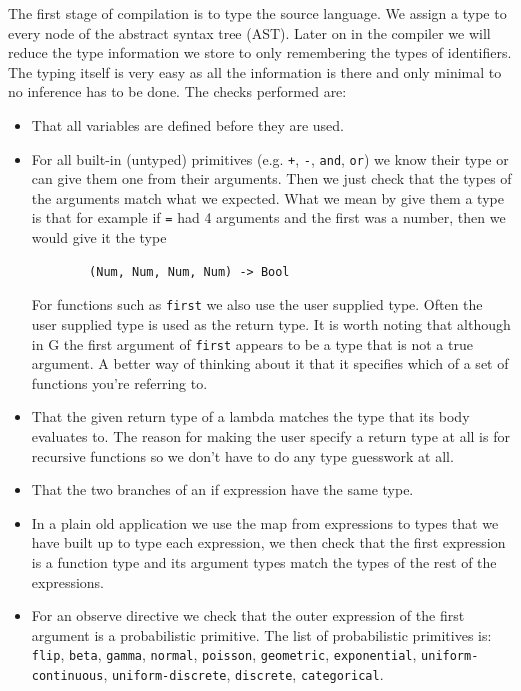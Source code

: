 \documentclass[a4paper]{article}
\begin{document}
The first stage of compilation is to type the source language. We assign a type to every node of the abstract syntax tree (AST). Later on in the compiler we will reduce the type information we store to only remembering the types of identifiers. The typing itself is very easy as all the information is there and only minimal to no inference has to be done. The checks performed are:
\begin{itemize}
\item
	That all variables are defined before they are used.

\item
	For all built-in (untyped) primitives (e.g. \texttt{+}, \texttt{-}, \texttt{and}, \texttt{or}) we know their type or can give them one from their arguments. Then we just check that the types of the arguments match what we expected. What we mean by give them a type is that for example if \texttt{=} had 4 arguments and the first was a number, then we would give it the type
	\begin{verbatim}
		(Num, Num, Num, Num) -> Bool
	\end{verbatim}
	For functions such as \texttt{first} we also use the user supplied type. Often the user supplied type is used as the return type. It is worth noting that although in G the first argument of \texttt{first} appears to be a type that is not a true argument. A better way of thinking about it that it specifies which of a set of functions you're referring to.

\item
	That the given return type of a lambda matches the type that its body evaluates to. The reason for making the user specify a return type at all is for recursive functions so we don't have to do any type guesswork at all.

\item
	That the two branches of an if expression have the same type.

\item
	In a plain old application we use the map from expressions to types that we have built up to type each expression, we then check that the first expression is a function type and its argument types match the types of the rest of the expressions.

\item
	For an observe directive we check that the outer expression of the first argument is a probabilistic primitive. The list of probabilistic primitives is: \texttt{flip}, \texttt{beta}, \texttt{gamma}, \texttt{normal}, \texttt{poisson}, \texttt{geometric}, \texttt{exponential}, \texttt{uniform-continuous}, \texttt{uniform-discrete}, \texttt{discrete}, \texttt{categorical}.

\end{itemize}
\end{document}
